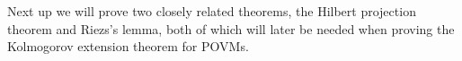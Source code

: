 \documentclass[a4paper,12pt]{wihuri}
\theoremstyle{definition}
\newtheorem{definition}{Definition}
\numberwithin{definition}{section}
\numberwithin{example}{section}
\numberwithin{theorem}{section}
\numberwithin{proposition}{section}
\numberwithin{lemma}{section}
\newcommand{\hi}{\mathcal{H}}%
\newcommand{\lin}{\mathcal{L}}%
\begin{document}



Next up we will prove two closely related theorems, the Hilbert projection theorem and Riezs's lemma, both of which will later be needed when proving the Kolmogorov extension theorem for POVMs.
\end{document}
